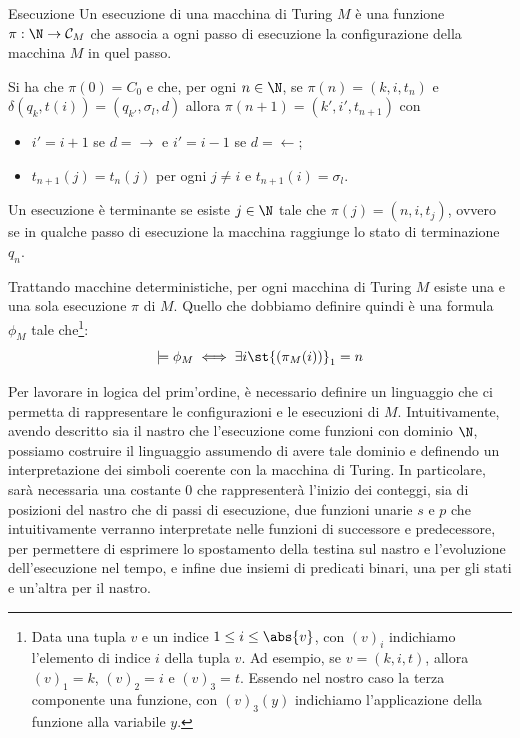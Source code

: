 \begin{definition}{Esecuzione}
  Un esecuzione di una macchina di Turing \(M\) è una funzione \(\pi: \N \to \mathcal{C}_M\) che associa a ogni passo di esecuzione la configurazione della macchina \(M\) in quel passo.
  
  Si ha che \(\pi(0) = C_0\) e che, per ogni \(n\in\N\), se \(\pi(n) = (k, i, t_n)\) e \(\delta(q_k, t(i)) = (q_{k'}, \sigma_l, d)\) allora \(\pi(n +1) = (k', i', t_{n+1})\) con
  \begin{itemize}
    \item \(i' = i + 1\) se \(d = \rightarrow\) e \(i' = i - 1\) se \(d = \leftarrow\);
    \item \(t_{n+1}(j) = t_n(j)\) per ogni \(j \neq i\) e \(t_{n+1}(i) = \sigma_l\).
  \end{itemize}

  Un esecuzione è terminante se esiste \(j\in\N\) tale che \(\pi(j) = (n, i, t_j)\), ovvero se in qualche passo di esecuzione la macchina raggiunge lo stato di terminazione \(q_n\).
\end{definition}

Trattando macchine deterministiche, per ogni macchina di Turing \(M\) esiste una e una sola esecuzione \(\pi\) di \(M\). 
Quello che dobbiamo definire quindi è una formula \(\phi_M\) tale che\footnote{Data una tupla \(v\) e un indice \(1 \leq i \leq \abs{v}\), con \({(v)}_i\) indichiamo l'elemento di indice \(i\) della tupla \(v\). Ad esempio, se \(v = (k,i,t)\), allora \({(v)}_1 = k\), \({(v)}_2 = i\) e \({(v)}_3 = t\). Essendo nel nostro caso la terza componente una funzione, con \({(v)}_3(y)\) indichiamo l'applicazione della funzione alla variabile \(y\).}:
\[\models \phi_M \iff \exists i\st {(\pi_M(i))}_1 = n\]

Per lavorare in logica del prim'ordine, è necessario definire un linguaggio che ci permetta di rappresentare le configurazioni e le esecuzioni di \(M\). Intuitivamente, avendo descritto sia il nastro che l'esecuzione come funzioni con dominio \(\N\), possiamo costruire il linguaggio assumendo di avere tale dominio e definendo un interpretazione dei simboli coerente con la macchina di Turing. In particolare, sarà necessaria una costante \(0\) che rappresenterà l'inizio dei conteggi, sia di posizioni del nastro che di passi di esecuzione, due funzioni unarie \(s\) e \(p\) che intuitivamente verranno interpretate nelle funzioni di successore e predecessore, per permettere di esprimere lo spostamento della testina sul nastro e l'evoluzione dell'esecuzione nel tempo, e infine due insiemi di predicati binari, una per gli stati e un'altra per il nastro.

